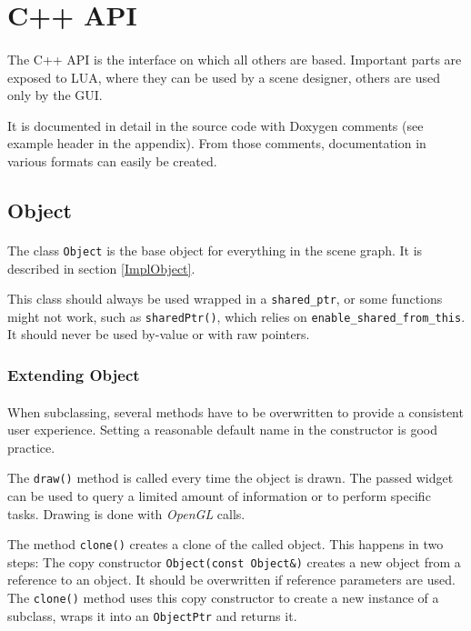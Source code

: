 \section{C++ API\label{CPPAPI}}
\paragraph{}
The C++ API is the interface on which all others are based.
Important parts are exposed to LUA, where they can be used by a scene designer, others are used only by the GUI.

It is documented in detail in the source code with Doxygen comments (see example header in the appendix).
From those comments, documentation in various formats can easily be created.

\subsection{Object\label{DocObject}}
\paragraph{}
The class \lstinline{Object} is the base object for everything in the scene graph.
It is described in section \ref{ImplObject}.

This class should always be used wrapped in a \lstinline{shared_ptr}, or some functions might not work, such as \lstinline{sharedPtr()}, which relies on \lstinline{enable_shared_from_this}.
It should never be used by-value or with raw pointers.


\subsubsection{Extending Object}
\paragraph{}
When subclassing, several methods have to be overwritten to provide a consistent user experience.
Setting a reasonable default name in the constructor is good practice.

The \lstinline{draw()} method is called every time the object is drawn.
The passed widget can be used to query a limited amount of information or to perform specific tasks.
Drawing is done with \textit{OpenGL} calls.

The method \lstinline{clone()} creates a clone of the called object.
This happens in two steps:
The copy constructor \lstinline{Object(const Object&)} creates a new object from a reference to an object.
It should be overwritten if reference parameters are used.
The \lstinline{clone()} method uses this copy constructor to create a new instance of a subclass, wraps it into an \lstinline{ObjectPtr} and returns it.

